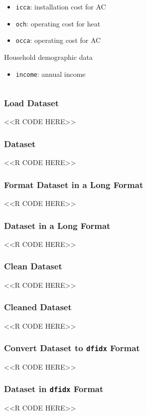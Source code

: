 \documentclass{beamer}
\begin{document}
\begin{frame}
\begin{columns}
\begin{column}{0.5\textwidth}
\begin{itemize}
                \item \texttt{icca}: installation cost for AC
                \item \texttt{och}: operating cost for heat
                \item \texttt{occa}: operating cost for AC
            \end{itemize}
            \vspace{2ex}
            Household demographic data
            \begin{itemize}
                \item \texttt{income}: annual income
            \end{itemize}
            \vspace{1ex}
        \end{column}
    \end{columns}
\end{frame}

\begin{frame}[fragile]\frametitle{Load Dataset}
    <<R CODE HERE>>
\end{frame}

\begin{frame}[fragile]\frametitle{Dataset}
    <<R CODE HERE>>
\end{frame}

\begin{frame}[fragile]\frametitle{Format Dataset in a Long Format}
    <<R CODE HERE>>
\end{frame}

\begin{frame}[fragile]\frametitle{Dataset in a Long Format}
    <<R CODE HERE>>
\end{frame}

\begin{frame}[fragile]\frametitle{Clean Dataset}
    <<R CODE HERE>>
\end{frame}

\begin{frame}[fragile]\frametitle{Cleaned Dataset}
    <<R CODE HERE>>
\end{frame}

\begin{frame}[fragile]\frametitle{Convert Dataset to \texttt{dfidx} Format}
    <<R CODE HERE>>
\end{frame}

\begin{frame}[fragile]\frametitle{Dataset in \texttt{dfidx} Format}
    <<R CODE HERE>>
\end{frame}
\end{document}
